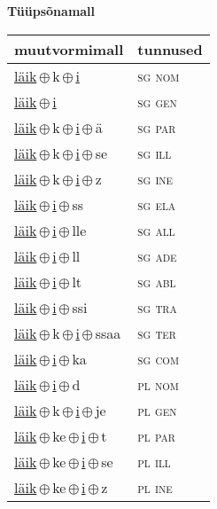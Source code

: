 

\vspace{3.5em}
\noindent \begin{minipage}{\textwidth}
\noindent \textbf{Tüüpsõnamall \,}\\

\begin{sideways}
\begin{tabular}{l l}
muutvormimall & tunnused \\
\hline
\underline{läik}\,$\oplus$\,k\,$\oplus$\,\underline{i} & \textsc{ sg nom } \\
\underline{läik}\,$\oplus$\,\underline{i} & \textsc{ sg gen } \\
\underline{läik}\,$\oplus$\,k\,$\oplus$\,\underline{i}\,$\oplus$\,ä & \textsc{ sg par } \\
\underline{läik}\,$\oplus$\,k\,$\oplus$\,\underline{i}\,$\oplus$\,se & \textsc{ sg ill } \\
\underline{läik}\,$\oplus$\,k\,$\oplus$\,\underline{i}\,$\oplus$\,z & \textsc{ sg ine } \\
\underline{läik}\,$\oplus$\,\underline{i}\,$\oplus$\,ss & \textsc{ sg ela } \\
\underline{läik}\,$\oplus$\,\underline{i}\,$\oplus$\,lle & \textsc{ sg all } \\
\underline{läik}\,$\oplus$\,\underline{i}\,$\oplus$\,ll & \textsc{ sg ade } \\
\underline{läik}\,$\oplus$\,\underline{i}\,$\oplus$\,lt & \textsc{ sg abl } \\
\underline{läik}\,$\oplus$\,\underline{i}\,$\oplus$\,ssi & \textsc{ sg tra } \\
\underline{läik}\,$\oplus$\,k\,$\oplus$\,\underline{i}\,$\oplus$\,ssaa & \textsc{ sg ter } \\
\underline{läik}\,$\oplus$\,\underline{i}\,$\oplus$\,ka & \textsc{ sg com } \\
\underline{läik}\,$\oplus$\,\underline{i}\,$\oplus$\,d & \textsc{ pl nom } \\
\underline{läik}\,$\oplus$\,k\,$\oplus$\,\underline{i}\,$\oplus$\,je & \textsc{ pl gen } \\
\underline{läik}\,$\oplus$\,ke\,$\oplus$\,\underline{i}\,$\oplus$\,t & \textsc{ pl par } \\
\underline{läik}\,$\oplus$\,ke\,$\oplus$\,\underline{i}\,$\oplus$\,se & \textsc{ pl ill } \\
\underline{läik}\,$\oplus$\,ke\,$\oplus$\,\underline{i}\,$\oplus$\,z & \textsc{ pl ine } \\

\end{tabular}
\end{sideways}
\end{minipage}
